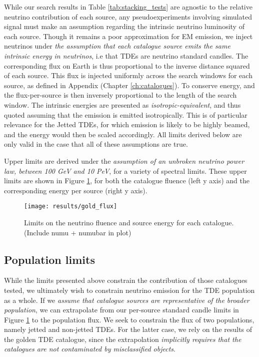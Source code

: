 While our search results in Table \ref{tab:stacking_tests} are agnostic to the relative neutrino contribution of each source, any pseudoexperiments involving simulated signal must make an assumption regarding the intrinsic neutrino luminosity of each source. Though it remains a poor approximation for EM emission, we inject neutrinos under \emph{the assumption that each catalogue source emits the same intrinsic energy in neutrinos}, i.e that TDEs are neutrino standard candles. The corresponding flux on Earth is thus proportional to the inverse distance squared of each source. This flux is injected uniformly across the search windows for each source, as defined in Appendix (Chapter \ref{ch:catalogues}). To conserve energy, and the flux-per-source is then inversely proportional to the length of the search window. The intrinsic energies are presented as \emph{isotropic-equivalent}, and thus quoted assuming that the emission is emitted isotropically. This is of particular relevance for the Jetted TDEs, for which emission is likely to be highly beamed, and the energy would then be scaled accordingly. All limits derived below are only valid in the case that all of these assumptions are true.

Upper limits are derived under the \emph{assumption of an unbroken neutrino power law, between 100 GeV and 10 PeV}, for a variety of spectral limits. These upper limits are shown in Figure \ref{fig:cat_upper_limit}, for both the catalogue fluence (left y axis) and the corresponding energy per source (right y axis). 

\begin{figure}[!ht]
	\centering \texttt{[image: results/gold\_flux]}
	\caption{Limits on the neutrino fluence and source energy for each catalogue. (Include numu + numubar in plot)}
	\label{fig:cat_upper_limit}
\end{figure}

\subsection{Population limits}

While the limits presented above constrain the contribution of those catalogues tested, we ultimately wish to constrain neutrino emission for the TDE population as a whole. If we \emph{assume that catalogue sources are representative of the broader population}, we can extrapolate from our per-source standard candle limits in Figure \ref{fig:cat_upper_limit} to the population flux. We seek to constrain the flux of two populations, namely jetted and non-jetted TDEs. For the latter case, we rely on the results of the golden TDE catalogue, since the extrapolation \emph{implicitly requires that the catalogues are not contaminated by misclassified objects}.

